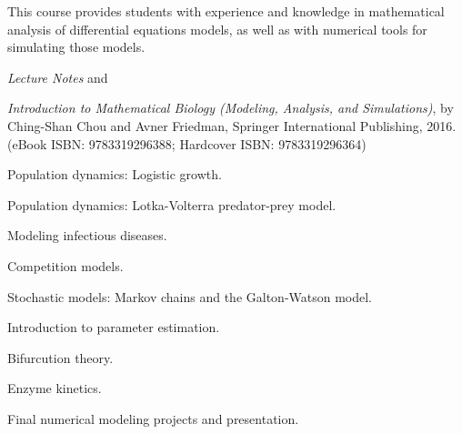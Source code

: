\documentclass{osucourse}
\begin{document}
\CatalogDescription
\PrerequisitesAndExclusions

\begin{Purpose}
This course provides students with experience and knowledge in mathematical analysis of differential equations models, as well as with numerical tools for simulating those models.
\end{Purpose}

\begin{Text}
\emph{Lecture Notes} and

\emph{Introduction to Mathematical Biology (Modeling, Analysis, and Simulations)}, by Ching-Shan Chou and Avner Friedman, Springer International Publishing, 2016. (eBook ISBN: 9783319296388; Hardcover ISBN: 9783319296364)
\end{Text}

\begin{TopicsList}
\item Population dynamics: Logistic growth.
\item Population dynamics: Lotka-Volterra predator-prey model.
\item Modeling infectious diseases.
\item Competition models.
\item Stochastic models: Markov chains and the Galton-Watson model.
\item Introduction to parameter estimation.
\item Bifurcution theory.
\item Enzyme kinetics.
\item Final numerical modeling projects and presentation.
\end{TopicsList}
\end{document}
